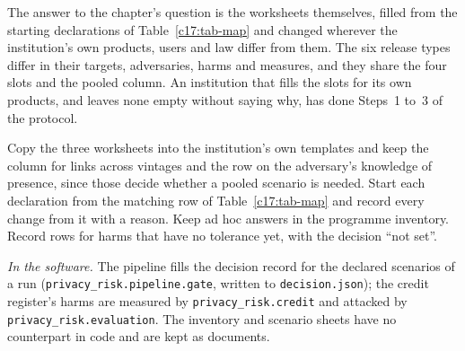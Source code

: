 The answer to the chapter's question is the worksheets themselves, filled from the
starting declarations of Table~\ref{c17:tab-map} and changed wherever the
institution's own products, users and law differ from them. The six release types
differ in their targets, adversaries, harms and measures, and they share the four
slots and the pooled column. An institution that fills the slots for its own
products, and leaves none empty without saying why, has done Steps~1 to~3 of the
protocol.

\begin{inpractice}
\setlength{\emergencystretch}{3em}%
Copy the three worksheets into the institution's own templates and keep the column
for links across vintages and the row on the adversary's knowledge of presence, since
those decide whether a pooled scenario is needed. Start each declaration from the
matching row of Table~\ref{c17:tab-map} and record every change from it with a
reason. Keep ad hoc answers in the programme inventory. Record rows for harms that
have no tolerance yet, with the decision ``not set''.

\smallskip\noindent\textit{In the software.} The pipeline fills the decision record
for the declared scenarios of a run (\texttt{privacy\_\allowbreak{}risk.\allowbreak{}pipeline.\allowbreak{}gate}, written to
\texttt{decision.\allowbreak{}json}); the credit register's harms are measured by
\texttt{privacy\_\allowbreak{}risk.\allowbreak{}credit} and attacked by \texttt{privacy\_\allowbreak{}risk.\allowbreak{}evaluation}. The
inventory and scenario sheets have no counterpart in code and are kept as documents.
\end{inpractice}
